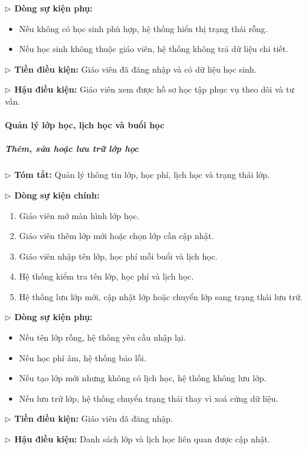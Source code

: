 \documentclass[12pt,a4paper]{article}
\begin{document}
\textbf{$\triangleright$ Dòng sự kiện phụ:}
\begin{itemize}[leftmargin=*]
\item Nếu không có học sinh phù hợp, hệ thống hiển thị trạng thái rỗng.
\item Nếu học sinh không thuộc giáo viên, hệ thống không trả dữ liệu chi tiết.
\end{itemize}

\textbf{$\triangleright$ Tiền điều kiện:} Giáo viên đã đăng nhập và có dữ liệu học sinh.

\textbf{$\triangleright$ Hậu điều kiện:} Giáo viên xem được hồ sơ học tập phục vụ theo dõi và tư vấn.

\paragraph{Quản lý lớp học, lịch học và buổi học}

\subparagraph{Thêm, sửa hoặc lưu trữ lớp học}
\textbf{$\triangleright$ Tóm tắt:} Quản lý thông tin lớp, học phí, lịch học và trạng thái lớp.

\textbf{$\triangleright$ Dòng sự kiện chính:}
\begin{enumerate}[leftmargin=*]
\item Giáo viên mở màn hình lớp học.
\item Giáo viên thêm lớp mới hoặc chọn lớp cần cập nhật.
\item Giáo viên nhập tên lớp, học phí mỗi buổi và lịch học.
\item Hệ thống kiểm tra tên lớp, học phí và lịch học.
\item Hệ thống lưu lớp mới, cập nhật lớp hoặc chuyển lớp sang trạng thái lưu trữ.
\end{enumerate}

\textbf{$\triangleright$ Dòng sự kiện phụ:}
\begin{itemize}[leftmargin=*]
\item Nếu tên lớp rỗng, hệ thống yêu cầu nhập lại.
\item Nếu học phí âm, hệ thống báo lỗi.
\item Nếu tạo lớp mới nhưng không có lịch học, hệ thống không lưu lớp.
\item Nếu lưu trữ lớp, hệ thống chuyển trạng thái thay vì xoá cứng dữ liệu.
\end{itemize}

\textbf{$\triangleright$ Tiền điều kiện:} Giáo viên đã đăng nhập.

\textbf{$\triangleright$ Hậu điều kiện:} Danh sách lớp và lịch học liên quan được cập nhật.
\end{document}
